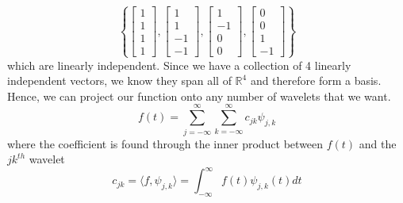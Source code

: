 \documentclass{report}
\theoremstyle{definition}
\theoremstyle{remark}
\newcommand{\R}{\mathbb{R}}
\begin{document}
\begin{equation*}
    \left\{ \begin{bmatrix}1\\1\\1\\1\end{bmatrix},\begin{bmatrix}1\\1\\-1\\-1\end{bmatrix},\begin{bmatrix}1\\-1\\0\\0\end{bmatrix},\begin{bmatrix}0\\0\\1\\-1\end{bmatrix} \right\}
\end{equation*}
which are linearly independent. Since we have a collection of 4 linearly independent vectors, we know they span all of $\R^4$ and therefore form a basis. Hence, we can project our function onto any number of wavelets that we want.
\begin{equation*}
    f(t) = \sum^\infty_{j=-\infty}\sum^\infty_{k=-\infty}c_{jk}\psi_{j,k}
\end{equation*}
where the coefficient is found through the inner product between $f(t)$ and the $jk^{th}$ wavelet 
\begin{equation*}
    c_{jk} =\langle f,\psi_{j,k}\rangle =\int^\infty_{-\infty}f(t)\psi_{j,k}(t)dt
\end{equation*}
\end{document}
